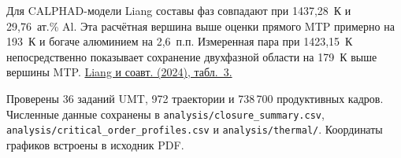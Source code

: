 \documentclass[11pt,a4paper]{article}
\begin{document}
Для CALPHAD-модели Liang составы фаз совпадают при 1437,28~К и 29,76~ат.\% Al. Эта расчётная вершина выше оценки прямого MTP примерно на 193~К и богаче алюминием на 2,6~п.п. Измеренная пара при 1423,15~К непосредственно показывает сохранение двухфазной области на 179~К выше вершины MTP. \href{https://doi.org/10.1007/s11669-024-01124-9}{Liang и соавт. (2024), табл.~3.}

{\footnotesize\color{muted}Проверены 36 заданий UMT, 972 траектории и 738\,700 продуктивных кадров. Численные данные сохранены в \texttt{analysis/closure\_summary.csv}, \texttt{analysis/critical\_order\_profiles.csv} и \texttt{analysis/thermal/}. Координаты графиков встроены в исходник PDF.}
\end{document}
